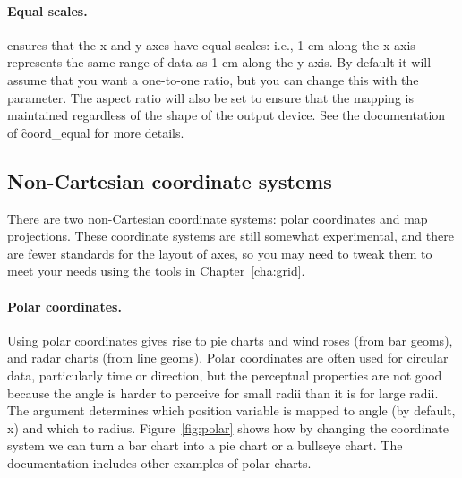 % 


\paragraph{Equal scales.}   ensures that the x and y axes have equal scales: i.e., 1 cm along the x axis represents the same range of data as 1 cm along the y axis.  By default it will assume that you want a one-to-one ratio, but you can change this with the  parameter.  The aspect ratio will also be set to ensure that the mapping is maintained regardless of the shape of the output device.  See the documentation of \f{coord_equal} for more details.

\subsection{Non-Cartesian coordinate systems}

There are two non-Cartesian coordinate systems: polar coordinates and map projections.  These coordinate systems are still somewhat experimental, and there are fewer standards for the layout of axes, so you may need to tweak them to meet your needs using the tools in Chapter~\ref{cha:grid}.

\paragraph{Polar coordinates.}  Using polar coordinates gives rise to pie charts and wind roses (from bar geoms), and radar charts (from line geoms).  Polar coordinates are often used for circular data, particularly time or direction, but the perceptual properties are not good because the angle is harder to perceive for small radii than it is for large radii.  The  argument determines which position variable is mapped to angle (by default, x) and which to radius.  Figure~\ref{fig:polar} shows how by changing the coordinate system we can turn a bar chart into a pie chart or a bullseye chart.  The documentation includes other examples of polar charts.

